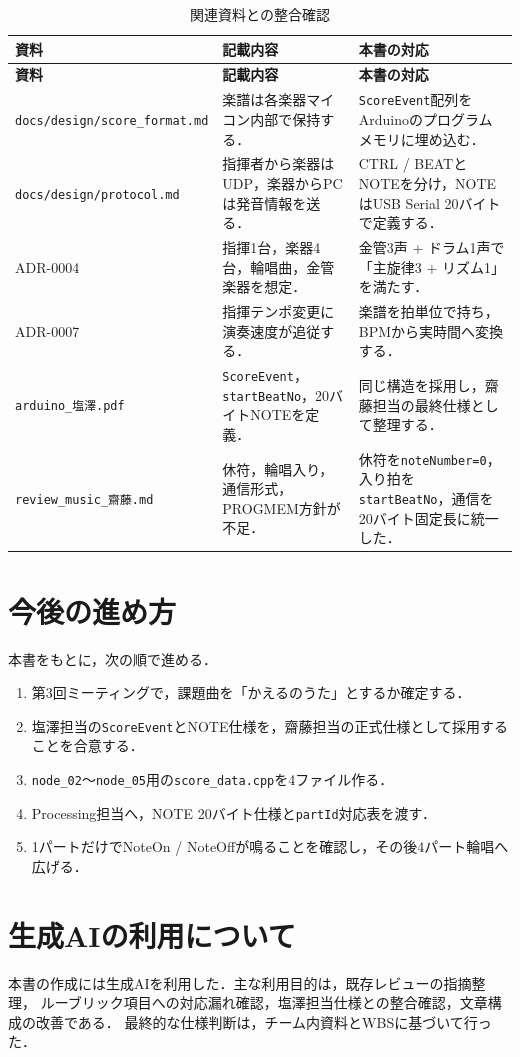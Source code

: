 \documentclass[uplatex,dvipdfmx]{jlreq}
\newcommand{\code}[1]{\texttt{#1}}
\begin{document}
\begin{longtable}{p{}p{}p{}}
\caption{関連資料との整合確認}\label{tab:consistency}\\
\toprule
\textbf{資料} & \textbf{記載内容} & \textbf{本書の対応} \\
\midrule
\endfirsthead
\toprule
\textbf{資料} & \textbf{記載内容} & \textbf{本書の対応} \\
\midrule
\endhead
\code{docs/design/score\_format.md} &
楽譜は各楽器マイコン内部で保持する． &
\code{ScoreEvent}配列をArduinoのプログラムメモリに埋め込む．\\
\code{docs/design/protocol.md} &
指揮者から楽器はUDP，楽器からPCは発音情報を送る． &
CTRL / BEATとNOTEを分け，NOTEはUSB Serial 20バイトで定義する．\\
ADR-0004 &
指揮1台，楽器4台，輪唱曲，金管楽器を想定． &
金管3声 + ドラム1声で「主旋律3 + リズム1」を満たす．\\
ADR-0007 &
指揮テンポ変更に演奏速度が追従する． &
楽譜を拍単位で持ち，BPMから実時間へ変換する．\\
\code{arduino\_塩澤.pdf} &
\code{ScoreEvent}，\code{startBeatNo}，20バイトNOTEを定義． &
同じ構造を採用し，齋藤担当の最終仕様として整理する．\\
\code{review\_music\_齋藤.md} &
休符，輪唱入り，通信形式，PROGMEM方針が不足． &
休符を\code{noteNumber=0}，入り拍を\code{startBeatNo}，通信を20バイト固定長に統一した．\\
\bottomrule
\end{longtable}

\section{今後の進め方}

本書をもとに，次の順で進める．
\begin{enumerate}
  \item 第3回ミーティングで，課題曲を「かえるのうた」とするか確定する．
  \item 塩澤担当の\code{ScoreEvent}とNOTE仕様を，齋藤担当の正式仕様として採用することを合意する．
  \item \code{node\_02}〜\code{node\_05}用の\code{score\_data.cpp}を4ファイル作る．
  \item Processing担当へ，NOTE 20バイト仕様と\code{partId}対応表を渡す．
  \item 1パートだけでNoteOn / NoteOffが鳴ることを確認し，その後4パート輪唱へ広げる．
\end{enumerate}

\section{生成AIの利用について}

本書の作成には生成AIを利用した．主な利用目的は，既存レビューの指摘整理，
ルーブリック項目への対応漏れ確認，塩澤担当仕様との整合確認，文章構成の改善である．
最終的な仕様判断は，チーム内資料とWBSに基づいて行った．
\end{document}
